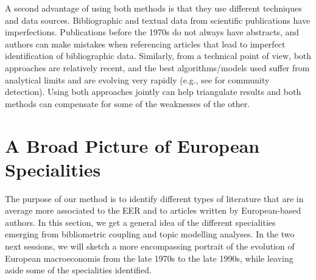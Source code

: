 \documentclass[]{elsarticle} %
\begin{document}
A second advantage of using both methods is that they use different
techniques and data sources. Bibliographic and textual data from
scientific publications have imperfections. Publications before the
1970s do not always have abstracts, and authors can make mistakes when
referencing articles that lead to imperfect identification of
bibliographic data. Similarly, from a technical point of view, both
approaches are relatively recent, and the best algorithms/models used
suffer from analytical limits and are evolving very rapidly (e.g., see
\citet{zhang2020} for community detection). Using both approaches
jointly can help triangulate results and both methods can compensate for
some of the weaknesses of the other.

\hypertarget{european-specialities}{%
\section{A Broad Picture of European
Specialities}\label{european-specialities}}

The purpose of our method is to identify different types of literature
that are in average more associated to the EER and to articles written
by European-based authors. In this section, we get a general idea of the
different specialities emerging from bibliometric coupling and topic
modelling analyses. In the two next sessions, we will sketch a more
encompassing portrait of the evolution of European macroeconomis from
the late 1970s to the late 1990s, while leaving aside some of the
specialities identified.
\end{document}
